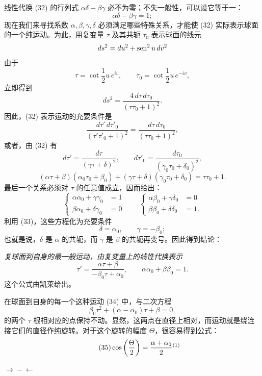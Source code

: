 线性代换 (32) 的行列式 \(\alpha\delta-\beta\gamma\) 必不为零；不失一般性，可以设它等于一：
\begin{equation}\tag{33}
 \alpha\delta-\beta\gamma=1;
\end{equation}
现在我们来寻找系数 \(\alpha,\beta,\gamma,\delta\) 必须满足哪些特殊关系，才能使 (32) 实际表示球面的一个纯运动。为此，用复变量 \(\tau\) 及其共轭 \(\tau_0\) 表示球面的线元
\[
 ds^2=du^2+\operatorname{sen}^2u\,dv^2
\]
由于
\[
 \tau=\cot\frac{1}{2}u\,e^{iv},\qquad
 \tau_0=\cot\frac{1}{2}u\,e^{-iv},
\]
立即得到
\[
 ds^2=\frac{4\,d\tau\,d\tau_0}{(\tau\tau_0+1)^2}.
\]
因此，(32) 表示运动的充要条件是
\[
 \frac{d\tau'\,d\tau'_0}{(\tau'\tau'_0+1)^2}
 =
 \frac{d\tau\,d\tau_0}{(\tau\tau_0+1)^2},
\]
或者，由 (32) 有
\[
 d\tau'=\frac{d\tau}{(\gamma\tau+\delta)^2},
 \qquad
 d\tau'_0=\frac{d\tau_0}{(\gamma_0\tau_0+\delta_0)^2},
\]
\[
 (\alpha\tau+\beta)(\alpha_0\tau_0+\beta_0)
 +(\gamma\tau+\delta)(\gamma_0\tau_0+\delta_0)=\tau\tau_0+1.
\]
最后一个关系必须对 \(\tau\) 的任意值成立，因而给出：
\[
\left\{
\begin{aligned}
 \alpha\alpha_0+\gamma\gamma_0&=1\\
 \beta\alpha_0+\delta\gamma_0&=0
\end{aligned}\right.
\qquad
\left\{
\begin{aligned}
 \alpha\beta_0+\gamma\delta_0&=0\\
 \beta\beta_0+\delta\delta_0&=1.
\end{aligned}\right.
\]
利用 (33)，这些方程化为充要条件
\[
 \delta=\alpha_0,\qquad \gamma=-\beta_0;
\]
也就是说，\(\delta\) 是 \(\alpha\) 的共轭，而 \(\gamma\) 是 \(\beta\) 的共轭再变号。因此得到结论：

\emph{复球面到自身的最一般运动，由复变量上的线性代换表示}
\begin{equation}\tag{34}
 \tau'=\frac{\alpha\tau+\beta}{-\beta_0\tau+\alpha_0},
 \qquad
 \alpha\alpha_0+\beta\beta_0=1.
\end{equation}
这个公式由凯莱给出。

在球面到自身的每一个这种运动 (34) 中，与二次方程
\[
 \beta_0\tau^2+(\alpha-\alpha_0)\tau+\beta=0,
\]
的两个 \(\tau\) 根相对应的点保持不动。显然，这两点在直径上相对，而运动就是绕连接它们的直径作纯旋转。对于这个旋转的幅度 \(\Theta\)，很容易得到公式：
\begin{equation}\tag{35}
 \cos\left(\frac{\Theta}{2}\right)=\frac{\alpha+\alpha_0}{2}\srcfnmark{1}
\end{equation}

\begin{center}
\(\longrightarrow\!\!\!\!\!\!\!\!-\!\!\!\!\!\!\!\!\longleftarrow\)
\end{center}
